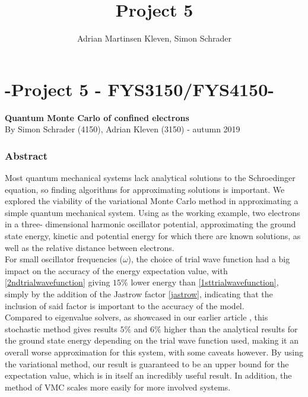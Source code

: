 \documentclass[10pt,a4paper]{article}
\author{Adrian Martinsen Kleven, Simon Schrader}
\title{Project 5}
\begin{document}
\part*{-Project 5 - FYS3150/FYS4150-
}
{\large \textbf{Quantum Monte Carlo of confined electrons}}\\
{\large By Simon Schrader (4150), Adrian Kleven (3150) - autumn 2019
}
\tableofcontents

\listoffigures
\listoftables


\clearpage

\section{Abstract}
Most quantum mechanical systems lack analytical solutions to the Schroedinger equation, so finding algorithms for approximating solutions is important. We explored the viability of the variational Monte Carlo method in approximating a simple quantum mechanical system. Using as the working example, two electrons in a three- dimensional harmonic oscillator potential, approximating the ground state energy, kinetic and potential energy for which there are known solutions\cite{Project2}, as well as the relative distance between electrons.\\
For small oscillator frequencies ($\omega$), the choice of trial wave function had a big impact on the accuracy of the energy expectation value, with \eqref{2ndtrialwavefunction} giving $15\%$ lower energy than \eqref{1sttrialwavefunction}, simply by the addition of the Jastrow factor \eqref{jastrow}, indicating that the inclusion of said factor is important to the accuracy of the model.\\Compared to eigenvalue solvers, as showcased in our earlier article \cite{Project2}, this stochastic method gives results $5\%$ and $6\%$ higher than the analytical results for the ground state energy depending on the trial wave function used,  making it an overall worse approximation for this system, with some caveats however. By using the variational method, our result is guaranteed to be an upper bound for the expectation value, which is in itself an incredibly useful result. In addition, the method of VMC scales more easily for more involved systems.
\end{document}
